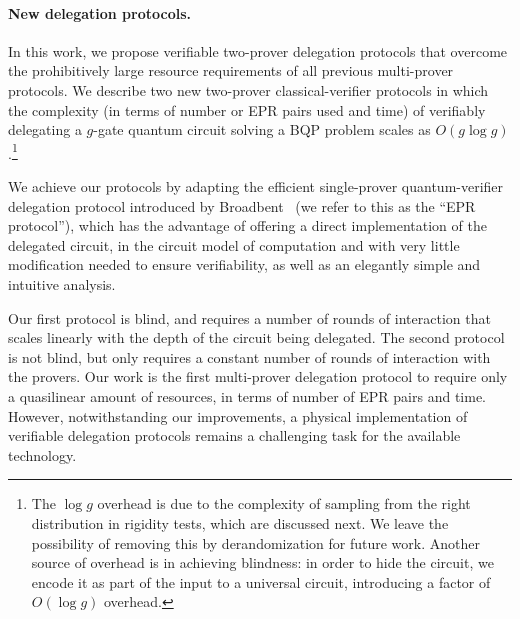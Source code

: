 \paragraph{New delegation protocols.} In this work, we propose verifiable two-prover delegation protocols that overcome the prohibitively large resource requirements of all previous multi-prover protocols. We describe two new two-prover classical-verifier protocols in which the complexity (in terms of number or EPR pairs used and time) of verifiably
delegating a $g$-gate quantum circuit solving a BQP problem scales as $O(g\log g)$.\footnote{The $\log
g$ overhead is due to the complexity of sampling from the right distribution in
rigidity tests, which are discussed next. We leave the possibility of removing this by derandomization for
future work. Another source of overhead is in achieving blindness: in order to
hide the circuit, we encode it as part of the input to a universal circuit,
introducing a factor of $O(\log g)$ overhead.} 

We achieve our protocols by adapting the efficient single-prover quantum-verifier delegation
protocol introduced by Broadbent~\cite{broadbent15howtoverify} (we refer to this as the ``EPR protocol''), which has the advantage of offering a direct implementation of the delegated circuit, in the circuit model of computation and with very little modification needed to ensure verifiability, as well as an elegantly simple and intuitive analysis. 
 
Our first protocol is blind, and requires a number of rounds of interaction that
scales linearly with the depth of the circuit being delegated. The second
protocol is not blind, but only requires a constant number of rounds of
interaction with the provers. Our work is the first multi-prover delegation protocol to require only a quasilinear amount of resources, in terms of number of EPR pairs and time. However, notwithstanding our improvements, a physical implementation  of verifiable delegation protocols remains a challenging task for the available technology.
 



